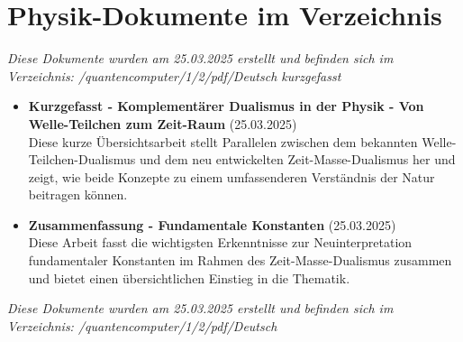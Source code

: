 \documentclass{article}
\begin{document}
	
	\section*{Physik-Dokumente im Verzeichnis}
\vspace{1.5cm}
\textit{Diese Dokumente wurden am 25.03.2025 erstellt und befinden sich im Verzeichnis: /quantencomputer/1/2/pdf/Deutsch kurzgefasst}

\vspace{1cm}

\begin{itemize}[leftmargin=*]
	\item \textbf{Kurzgefasst - Komplementärer Dualismus in der Physik - Von Welle-Teilchen zum Zeit-Raum} (25.03.2025)\\
	Diese kurze Übersichtsarbeit stellt Parallelen zwischen dem bekannten Welle-Teilchen-Dualismus und dem neu entwickelten Zeit-Masse-Dualismus her und zeigt, wie beide Konzepte zu einem umfassenderen Verständnis der Natur beitragen können.
	\item \textbf{Zusammenfassung - Fundamentale Konstanten} (25.03.2025)\\
	Diese Arbeit fasst die wichtigsten Erkenntnisse zur Neuinterpretation fundamentaler Konstanten im Rahmen des Zeit-Masse-Dualismus zusammen und bietet einen übersichtlichen Einstieg in die Thematik.
\end{itemize}

\vspace{1cm}
\textit{Diese Dokumente wurden am 25.03.2025 erstellt und befinden sich im Verzeichnis: /quantencomputer/1/2/pdf/Deutsch}
\end{document}
